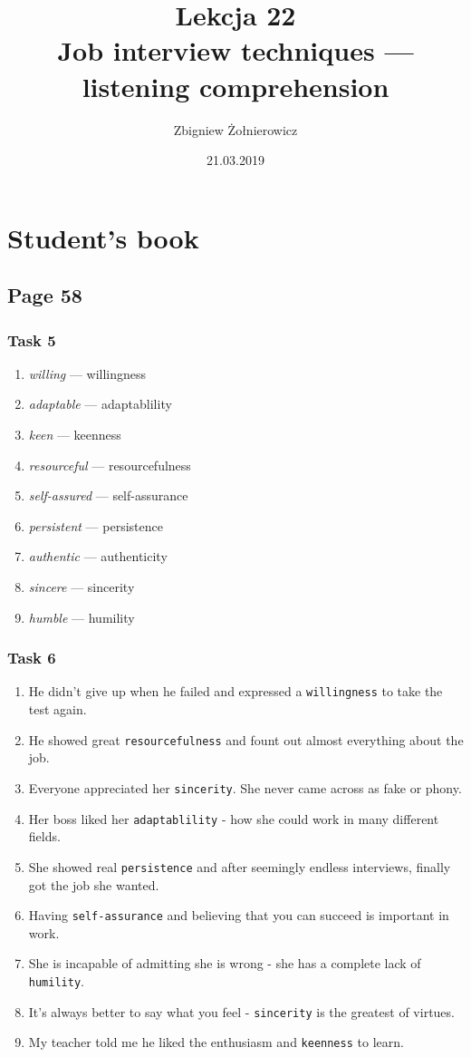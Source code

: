 \documentclass{article}
\begin{document}
\title{{\huge Lekcja 22} \\
{\large Job interview techniques --- listening comprehension}}
\author{Zbigniew Żołnierowicz}
\date{21.03.2019}
\maketitle
\section{Student's book}
\subsection{Page 58}
\subsubsection{Task 5}

\begin{enumerate}
    \item \emph{willing} --- willingness
    \item \emph{adaptable} --- adaptablility
    \item \emph{keen} --- keenness
    \item \emph{resourceful} --- resourcefulness
    \item \emph{self-assured} --- self-assurance
    \item \emph{persistent} --- persistence
    \item \emph{authentic} --- authenticity
    \item \emph{sincere} --- sincerity
    \item \emph{humble} --- humility
\end{enumerate}
\subsubsection{Task 6}
\begin{enumerate}
    \item He didn't give up when he failed and expressed a {\tt willingness} to take the test again.
    \item He showed great {\tt resourcefulness} and fount out almost everything about the job.
    \item Everyone appreciated her {\tt sincerity}. She never came across as fake or phony.
    \item Her boss liked her {\tt adaptablility} - how she could work in many different fields.
    \item She showed real {\tt persistence} and after seemingly endless interviews, finally got the job she wanted.
    \item Having {\tt self-assurance} and believing that you can succeed is important in work.
    \item She is incapable of admitting she is wrong - she has a complete lack of {\tt humility}.
    \item It's always better to say what you feel - {\tt sincerity} is the greatest of virtues.
    \item My teacher told me he liked the enthusiasm and {\tt keenness} to learn.
\end{enumerate}
\end{document}
